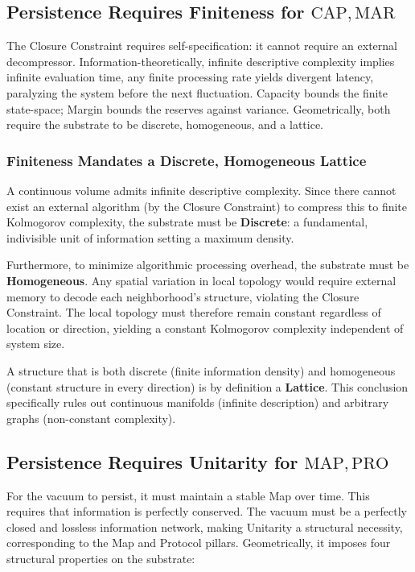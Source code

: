 \subsection{Persistence Requires Finiteness for \texorpdfstring{$\mathrm{CAP}, \mathrm{MAR}$}{CAP, MAR}}
\label{sec:finiteness}
The Closure Constraint requires self-specification: it cannot require an external decompressor. Information-theoretically, infinite descriptive complexity implies infinite evaluation time, any finite processing rate yields divergent latency, paralyzing the system before the next fluctuation. Capacity bounds the finite state-space; Margin bounds the reserves against variance. Geometrically, both require the substrate to be discrete, homogeneous, and a lattice.

\subsubsection{Finiteness Mandates a Discrete, Homogeneous Lattice}
\label{subsubsec:discrete_homogeneous_lattice}

A continuous volume admits infinite descriptive complexity. Since there cannot exist an external algorithm (by the Closure Constraint) to compress this to finite Kolmogorov complexity, the substrate must be \textbf{Discrete}: a fundamental, indivisible unit of information setting a maximum density.

Furthermore, to minimize algorithmic processing overhead, the substrate must be \textbf{Homogeneous}. Any spatial variation in local topology would require external memory to decode each neighborhood's structure, violating the Closure Constraint. The local topology must therefore remain constant regardless of location or direction, yielding a constant Kolmogorov complexity independent of system size.

A structure that is both discrete (finite information density) and homogeneous (constant structure in every direction) is by definition a \textbf{Lattice}. This conclusion specifically rules out continuous manifolds (infinite description) and arbitrary graphs (non-constant complexity).

\subsection{Persistence Requires Unitarity for \texorpdfstring{$\mathrm{MAP}, \mathrm{PRO}$}{MAP, PRO}}
\label{sec:unitarity}

For the vacuum to persist, it must maintain a stable Map over time. This requires that information is perfectly conserved. The vacuum must be a perfectly closed and lossless information network, making Unitarity a structural necessity, corresponding to the Map and Protocol pillars. Geometrically, it imposes four structural properties on the substrate:

